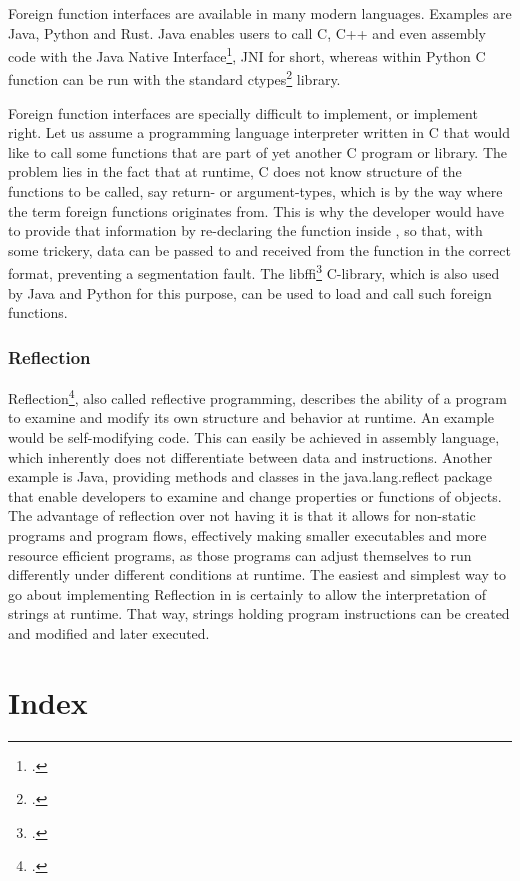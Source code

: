 \documentclass[12pt,a4paper,man]{apa7}
\begin{document}
Foreign function interfaces are available in many modern languages.
Examples are Java, Python and Rust.
Java enables users to call C, C++ and even assembly code with the Java Native
Interface\footcite{JNI}, JNI for short, whereas within Python C function can
be run with the standard ctypes\footcite{ctypes} library.

Foreign function interfaces are specially difficult to implement, or implement
right. Let us assume a programming language interpreter \name written in C that
would like to call some functions that are part of yet another C program or
library. The problem lies in the fact that at runtime, C does not know
structure of the functions to be called, say return- or argument-types, which
is by the way where the term foreign functions originates from. This is why the
\name developer would have to provide that information by re-declaring the
function inside \name, so that, with some trickery, data can be passed to and
received from the function in the correct format, preventing a segmentation
fault. The libffi\footcite{libffi} C-library, which is also used by Java and
Python for this purpose, can be used to load and call such foreign functions.

\subsubsection{Reflection}
Reflection\footcite{reflection}, also called reflective programming, describes
the ability of a program to examine and modify its own structure and behavior 
at runtime. An example would be self-modifying code. This can easily be
achieved in assembly language, which inherently does not differentiate between
data and instructions.
Another example is Java, providing methods and classes in the java.lang.reflect
package that enable developers to examine and change properties or functions
of objects.
The advantage of reflection over not having it is that it allows for non-static
programs and program flows, effectively making smaller executables and more
resource efficient programs, as those programs can adjust themselves to run
differently under different conditions at runtime.
The easiest and simplest way to go about implementing Reflection in \name is
certainly to allow the interpretation of strings at runtime. That way, strings
holding program instructions can be created and modified and later executed.

\section{Index}
\end{document}
